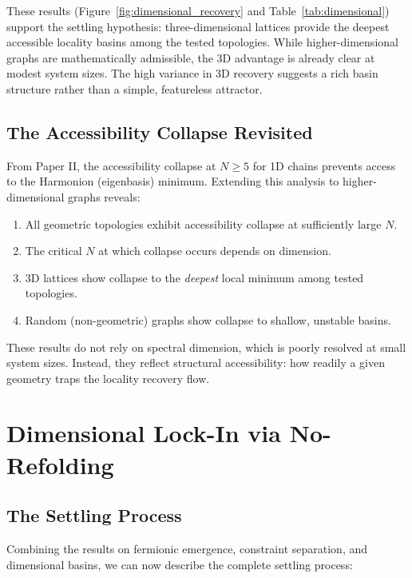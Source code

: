 \documentclass[11pt]{article}
\begin{document}
These results (Figure~\ref{fig:dimensional_recovery} and Table~\ref{tab:dimensional}) support the settling hypothesis: three-dimensional lattices provide the deepest accessible locality basins among the tested topologies. While higher-dimensional graphs are mathematically admissible, the 3D advantage is already clear at modest system sizes. The high variance in 3D recovery suggests a rich basin structure rather than a simple, featureless attractor.

\subsection{The Accessibility Collapse Revisited}

From Paper II, the accessibility collapse at $N \geq 5$ for 1D chains prevents access to the Harmonion (eigenbasis) minimum. Extending this analysis to higher-dimensional graphs reveals:

\begin{enumerate}
\item All geometric topologies exhibit accessibility collapse at sufficiently large $N$.
\item The critical $N$ at which collapse occurs depends on dimension.
\item 3D lattices show collapse to the \emph{deepest} local minimum among tested topologies.
\item Random (non-geometric) graphs show collapse to shallow, unstable basins.
\end{enumerate}

These results do not rely on spectral dimension, which is poorly resolved at small system sizes. Instead, they reflect structural accessibility: how readily a given geometry traps the locality recovery flow.

\section{Dimensional Lock-In via No-Refolding}

\subsection{The Settling Process}

Combining the results on fermionic emergence, constraint separation, and dimensional basins, we can now describe the complete settling process:
\end{document}
